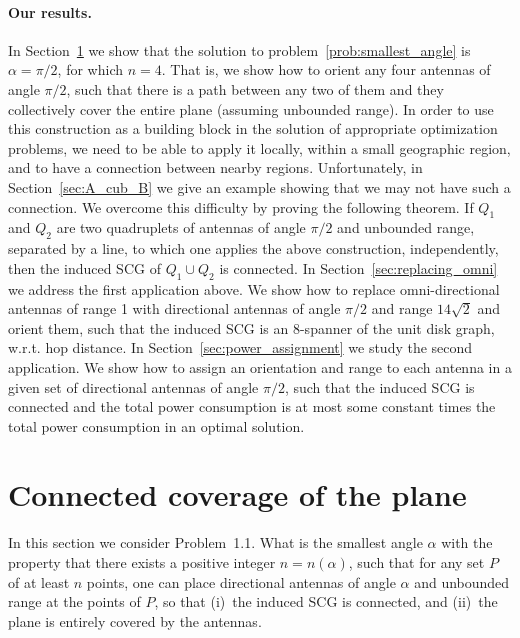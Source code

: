 \documentclass[11pt,letter]{article}
\begin{document}
\paragraph{Our results.}
In Section~\ref{sec:connected_coverage} we show that the solution to problem~\ref{prob:smallest_angle} is $\alpha=\pi/2$, for which $n=4$. That is, we show how to orient any four antennas of angle $\pi/2$, such that there is a path between any two of them and they collectively cover the entire plane (assuming unbounded range).
In order to use this construction as a building block in the solution of appropriate optimization problems, we need to be able to apply it locally, within a small geographic region, and to have a connection between nearby regions. Unfortunately, in Section~\ref{sec:A_cub_B} we give an example showing that we may not have such a connection. We overcome this difficulty by proving the following theorem. If $Q_1$ and $Q_2$ are two quadruplets of
antennas of angle $\pi/2$ and unbounded range, separated by a line, to which one applies the above construction, independently, then
the induced SCG of $Q_1 \cup Q_2$ is connected.
In Section~\ref{sec:replacing_omni} we address the first application above. We show how to replace omni-directional antennas of range 1 with directional antennas of angle $\pi/2$ and range $14\sqrt{2}$ and orient them, such that the induced SCG is an 8-spanner of the unit disk graph, w.r.t. hop distance.
In Section~\ref{sec:power_assignment} we study the second application. We show how to assign an orientation and range to each antenna in a given set of directional antennas of angle $\pi/2$, such that the induced SCG is connected and the total power consumption is at most some constant times the total power consumption in an optimal solution.
























\section{Connected coverage of the plane}\label{sec:connected_coverage}


In this section we consider Problem~1.1.
What is the smallest angle $\alpha$ with the property that there exists a positive integer $n=n(\alpha)$,
such that for any set $P$ of at least $n$ points,
one can place directional antennas of angle $\alpha$ and unbounded range at the points of $P$, so that
(i)~the induced SCG is connected,
and (ii)~the plane is entirely covered by the antennas.
\end{document}
